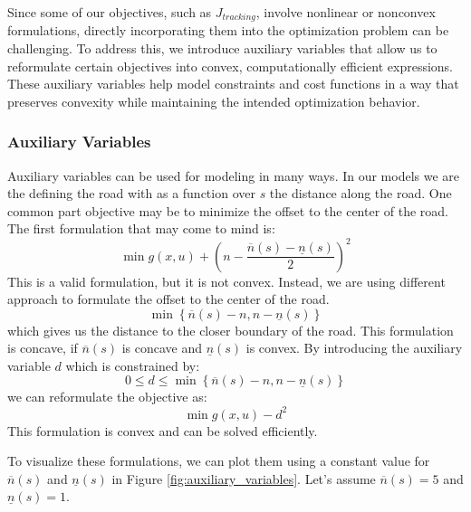 Since some of our objectives, such as $J_{tracking}$, involve nonlinear or nonconvex formulations, directly incorporating them into the optimization
problem can be challenging.
To address this, we introduce auxiliary variables that allow us to reformulate certain objectives into convex, computationally efficient expressions.
These auxiliary variables help model constraints and cost functions in a way that preserves convexity while maintaining the intended optimization
behavior.

\subsubsection{Auxiliary Variables}

Auxiliary variables can be used for modeling in many ways.
In our models we are the defining the road with as a function over $s$ the distance along the road.
One common part objective may be to minimize the offset to the center of the road.
The first formulation that may come to mind is: \[ \min g(x, u) + \left( n - \frac{\overline{n}(s) - \underline{n}(s)}{2} \right)^2 \] This is a
valid formulation, but it is not convex.
Instead, we are using different approach to formulate the offset to the center of the road.
\[
	\min \left\{ \overline{n}(s) - n, n - \underline{n}(s) \right\}
\]
which gives us the distance to the closer boundary of the road.
This formulation is concave, if $\overline{n}(s)$ is concave and $\underline{n}(s)$ is convex.
By introducing the auxiliary variable $d$ which is constrained by: \[ 0 \leq d \leq \min \left\{ \overline{n}(s) - n, n - \underline{n}(s) \right\}
\] we can reformulate the objective as: \[ \min g(x, u) - d^2 \] This formulation is convex and can be solved efficiently.

To visualize these formulations, we can plot them using a constant value for \(\overline{n}(s)\) and \(\underline{n}(s)\) in Figure
\ref{fig:auxiliary_variables}.
Let's assume \(\overline{n}(s) = 5\) and \(\underline{n}(s) = 1\).

